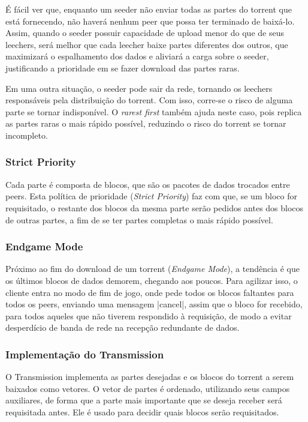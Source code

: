 É fácil ver que, enquanto um \gls*{seeder} não enviar todas as partes do \gls*{torrent}
que está fornecendo, não haverá nenhum \gls*{peer} que possa ter terminado de baixá-lo.
Assim, quando o \gls*{seeder} possuir capacidade de upload menor do que de seus
\glspl*{leecher}, será melhor que cada \gls*{leecher} baixe partes diferentes dos
outros, que maximizará o espalhamento dos dados e aliviará a carga sobre o \gls*{seeder},
justificando a prioridade em se fazer download das partes raras.

\newpage
Em uma outra situação, o \gls*{seeder} pode sair da rede, tornando os \glspl*{leecher}
responsáveis pela distribuição do \gls*{torrent}. Com isso, corre-se o risco de alguma
parte se tornar indisponível. O \emph{rarest first} também ajuda neste caso, pois
replica as partes raras o mais rápido possível, reduzindo o risco do \gls*{torrent} se
tornar incompleto.

\subsubsection*{Strict Priority}

Cada parte é composta de blocos, que são os pacotes de dados trocados entre
\glspl*{peer}. Esta política de prioridade (\emph{Strict Priority}) faz com que, se um
bloco for requisitado, o restante dos blocos da mesma parte serão pedidos antes dos
blocos de outras partes, a fim de se ter partes completas o mais rápido possível.

\subsubsection*{Endgame Mode}
\label{subsubsec:endgame}

Próximo ao fim do download de um \gls*{torrent} (\emph{Endgame Mode}), a tendência é
que os últimos blocos de dados demorem, chegando aos poucos. Para agilizar isso, o
cliente entra no modo de fim de jogo, onde pede todos os blocos faltantes para todos os
\glspl*{peer}, enviando uma mensagem \bverb|cancel|, assim que o bloco for recebido,
para todos aqueles que não tiverem respondido à requisição, de modo a evitar desperdício
de banda de rede na recepção redundante de dados.

\subsubsection*{Implementação do Transmission}

O Transmission implementa as partes desejadas e os blocos do \gls*{torrent} a serem
baixados como vetores. O vetor de partes é ordenado, utilizando seus campos auxiliares,
de forma que a parte mais importante que se deseja receber será requisitada antes. Ele
é usado para decidir quais blocos serão requisitados.

